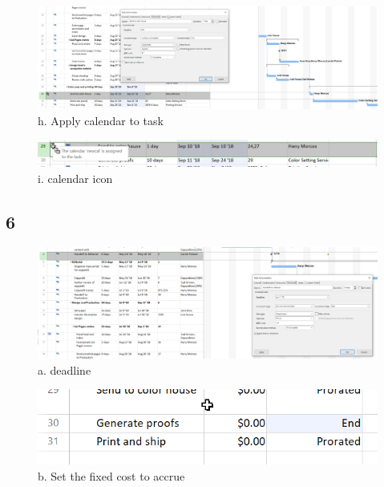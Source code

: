 \documentclass[runningheads]{llncs}
\begin{document}
\begin{figure}[H]
    \centering
    \includegraphics[width=1.0\textwidth]{image/fh}
    \caption{h. Apply calendar to task}
\end{figure}

\begin{figure}[H]
    \centering
    \includegraphics[width=1.0\textwidth]{image/fi}
    \caption{i. calendar icon}
\end{figure}


\subsection*{6}
\begin{figure}[H]
    \centering
    \includegraphics[width=1.0\textwidth]{image/f2a}
    \caption{a. deadline}
\end{figure}

\begin{figure}[H]
    \centering
    \includegraphics[width=1.0\textwidth]{image/f2b}
    \caption{b. Set the fixed cost to accrue}
\end{figure}
\end{document}
